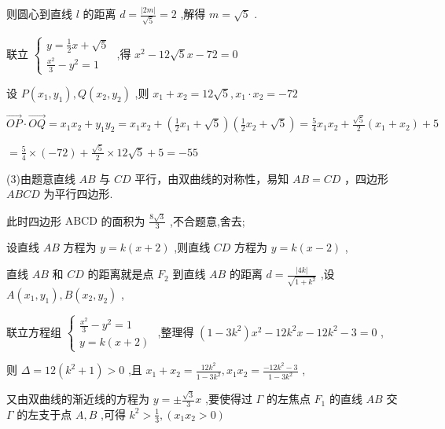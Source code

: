 \documentclass[10pt]{article}
\begin{document}
则圆心到直线 \(l\) 的距离 \(d = \frac{\left| 2m\right| }{\sqrt{5}} = 2\) ,解得 \(m = \sqrt{5}\) .

联立 \(\left\{  \begin{array}{l} y = \frac{1}{2}x + \sqrt{5} \\  \frac{{x}^{2}}{3} - {y}^{2} = 1 \end{array}\right.\) ,得 \({x}^{2} - {12}\sqrt{5}x - {72} = 0\)

设 \(P\left( {{x}_{1},{y}_{1}}\right) ,Q\left( {{x}_{2},{y}_{2}}\right)\) ,则 \({x}_{1} + {x}_{2} = {12}\sqrt{5},{x}_{1} \cdot  {x}_{2} =  - {72}\)

\(\overrightarrow{OP} \cdot  \overrightarrow{OQ} = {x}_{1}{x}_{2} + {y}_{1}{y}_{2} = {x}_{1}{x}_{2} + \left( {\frac{1}{2}{x}_{1} + \sqrt{5}}\right) \left( {\frac{1}{2}{x}_{2} + \sqrt{5}}\right)  = \frac{5}{4}{x}_{1}{x}_{2} + \frac{\sqrt{5}}{2}\left( {{x}_{1} + {x}_{2}}\right)  + 5\)

\(= \frac{5}{4} \times  \left( {-{72}}\right)  + \frac{\sqrt{5}}{2} \times  {12}\sqrt{5} + 5 =  - {55}\)

(3)由题意直线 \({AB}\) 与 \({CD}\) 平行，由双曲线的对称性，易知 \({AB} = {CD}\) ，四边形 \({ABCD}\) 为平行四边形.

此时四边形 \(\mathrm{{ABCD}}\) 的面积为 \(\frac{8\sqrt{3}}{3}\) ,不合题意,舍去;

设直线 \({AB}\) 方程为 \(y = k\left( {x + 2}\right)\) ,则直线 \({CD}\) 方程为 \(y = k\left( {x - 2}\right)\) ,

直线 \({AB}\) 和 \({CD}\) 的距离就是点 \({F}_{2}\) 到直线 \({AB}\) 的距离 \(d = \frac{\left| 4k\right| }{\sqrt{1 + {k}^{2}}}\) ,设 \(A\left( {{x}_{1},{y}_{1}}\right) ,B\left( {{x}_{2},{y}_{2}}\right)\) ,

联立方程组 \(\left\{  \begin{array}{l} \frac{{x}^{2}}{3} - {y}^{2} = 1 \\  y = k\left( {x + 2}\right)  \end{array}\right.\) ,整理得 \(\left( {1 - 3{k}^{2}}\right) {x}^{2} - {12}{k}^{2}x - {12}{k}^{2} - 3 = 0\) ,

则 \(\Delta  = {12}\left( {{k}^{2} + 1}\right)  > 0\) ,且 \({x}_{1} + {x}_{2} = \frac{{12}{k}^{2}}{1 - 3{k}^{2}},{x}_{1}{x}_{2} = \frac{-{12}{k}^{2} - 3}{1 - 3{k}^{2}}\) ,

又由双曲线的渐近线的方程为 \(y =  \pm  \frac{\sqrt{3}}{3}x\) ,要使得过 \(\Gamma\) 的左焦点 \({F}_{1}\) 的直线 \({AB}\) 交 \(\Gamma\) 的左支于点 \(A,B\) ,可得 \({k}^{2} > \frac{1}{3},\left( {{x}_{1}{x}_{2} > 0}\right)\)
\end{document}
